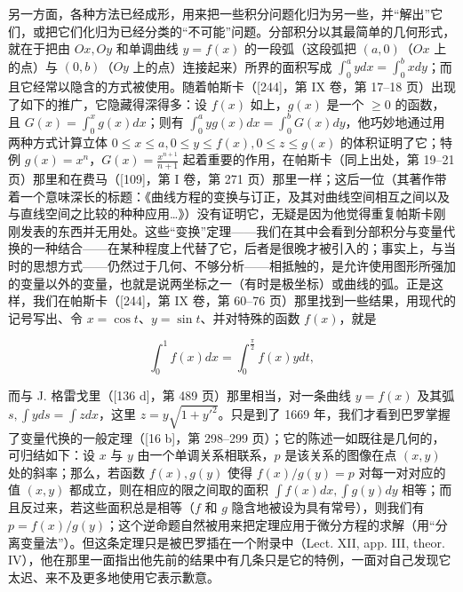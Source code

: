 另一方面，各种方法已经成形，用来把一些积分问题化归为另一些，并“解出”它们，或把它们化归为已经分类的“不可能”问题。分部积分以其最简单的几何形式，就在于把由 \(Ox, Oy\) 和单调曲线 \(y = f(x)\) 的一段弧（这段弧把 \((a, 0)\)（\(Ox\) 上的点）与 \((0, b)\)（\(Oy\) 上的点）连接起来）所界的面积写成 \(\int_{0}^{a} ydx = \int_{0}^{b} xdy\)；而且它经常以隐含的方式被使用。随着帕斯卡（{[}244{]}，第 IX 卷，第 17–18 页）出现了如下的推广，它隐藏得深得多：设 \(f(x)\) 如上，\(g(x)\) 是一个 \(\geq 0\) 的函数，且 \(G(x) = \int_{0}^{x} g(x)dx\)；则有 \(\int_{0}^{a} yg(x)dx = \int_{0}^{b} G(x)dy\)，他巧妙地通过用两种方式计算立体 \(0 \leq x \leq a, 0 \leq y \leq f(x), 0 \leq z \leq g(x)\) 的体积证明了它；特例 \(g(x) = x^n\)，\(G(x) = \frac{x^{n+1}}{n+1}\) 起着重要的作用，在帕斯卡（同上出处，第 19–21 页）那里和在费马（{[}109{]}，第 I 卷，第 271 页）那里一样；这后一位（其著作带着一个意味深长的标题：《曲线方程的变换与订正，及其对曲线空间相互之间以及与直线空间之比较的种种应用\ldots{}》）没有证明它，无疑是因为他觉得重复帕斯卡刚刚发表的东西并无用处。这些“变换”定理——我们在其中会看到分部积分与变量代换的一种结合——在某种程度上代替了它，后者是很晚才被引入的；事实上，与当时的思想方式——仍然过于几何、不够分析——相抵触的，是允许使用图形所强加的变量以外的变量，也就是说两坐标之一（有时是极坐标）或曲线的弧。正是这样，我们在帕斯卡（{[}244{]}，第 IX 卷，第 60–76 页）那里找到一些结果，用现代的记号写出、令 \(x = \cos t\)、\(y = \sin t\)、并对特殊的函数 \(f(x)\)，就是

\[
\int_ {0} ^ {1} f (x) d x = \int_ {0} ^ {\frac {\pi}{2}} f (x) y d t,
\]

而与 J. 格雷戈里（{[}136 d{]}，第 489 页）那里相当，对一条曲线 \(y = f(x)\) 及其弧 \(s, \int yds = \int zdx\)，这里 \(z = y\sqrt{1 + y'^2}\)。只是到了 1669 年，我们才看到巴罗掌握了变量代换的一般定理（{[}16 b{]}，第 298–299 页）；它的陈述一如既往是几何的，可归结如下：设 \(x\) 与 \(y\) 由一个单调关系相联系，\(p\) 是该关系的图像在点 \((x, y)\) 处的斜率；那么，若函数 \(f(x), g(y)\) 使得 \(f(x)/g(y) = p\) 对每一对对应的值 \((x, y)\) 都成立，则在相应的限之间取的面积 \(\int f(x)dx, \int g(y)dy\) 相等；而且反过来，若这些面积总是相等（\(f\) 和 \(g\) 隐含地被设为具有常号），则我们有 \(p = f(x)/g(y)\)；这个逆命题自然被用来把定理应用于微分方程的求解（用“分离变量法”）。但这条定理只是被巴罗插在一个附录中（Lect. XII, app. III, theor. IV），他在那里一面指出他先前的结果中有几条只是它的特例，一面对自己发现它太迟、来不及更多地使用它表示歉意。

